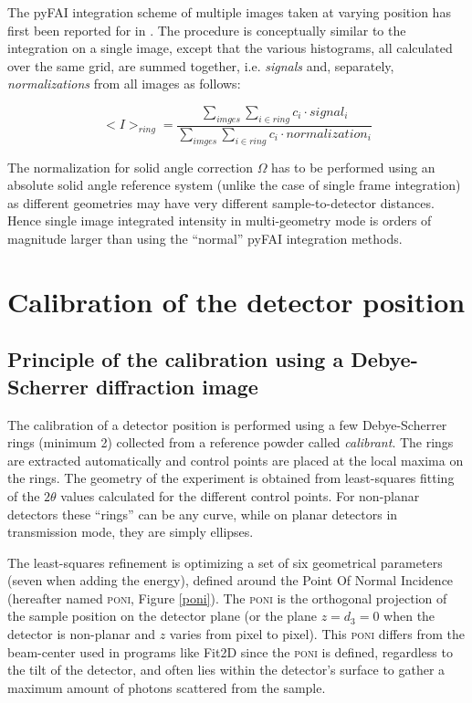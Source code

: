 \documentclass[preprint]{iucr}              %
\begin{document}
The pyFAI integration scheme of multiple images taken at varying position has
first been reported for  in  \cite{PyFAI_PDJ}. 
The procedure is conceptually similar to the integration on a single image,
except that the various histograms, all calculated over the same
grid, are summed together, i.e. \textit{signals} and, separately, 
\textit{normalizations} from all images as follows: 

\begin{equation}
<I>_{ring} = \frac{\sum\limits_{imges} \sum\limits_{i \in ring} c_i \cdot
signal_i} {\sum\limits_{imges} \sum\limits_{i \in ring} c_i \cdot
normalization_i} 
\end{equation}

The normalization for solid angle correction $\Omega$ has to be performed
using an absolute solid angle reference system (unlike the case of single
frame integration) as different geometries may have very different
sample-to-detector distances.
Hence single image integrated intensity in multi-geometry mode is orders of
magnitude larger than using the ``normal'' pyFAI integration methods.

\section{Calibration of the detector position}

\subsection{Principle of the calibration using a Debye-Scherrer diffraction
image}
The calibration of a detector position is performed using a few Debye-Scherrer
rings (minimum 2) collected from a reference powder called \textit{calibrant}.
The rings are extracted automatically and control points are placed at the
local maxima on the rings.
The geometry of the experiment is obtained from least-squares fitting of
the $2\theta$ values calculated for the different control points.
For non-planar detectors these ``rings'' can be any curve, while on planar 
detectors in transmission mode, they are simply ellipses.


The least-squares refinement is optimizing a set of six geometrical parameters
(seven when adding the energy), defined around the Point Of Normal Incidence 
(hereafter named \textsc{poni}, Figure \ref{poni}).
The \textsc{poni} is
the orthogonal projection of the sample position on the detector plane (or
the plane $z=d_3=0$ when the detector is non-planar and $z$ varies from pixel to pixel).
This \textsc{poni} differs from the beam-center used in programs like
Fit2D \cite{Hammersley:fs5107} since the \textsc{poni} is defined, 
regardless to the tilt of the detector, and often lies
within the detector's surface to gather a maximum amount of photons scattered from the sample.
\end{document}
